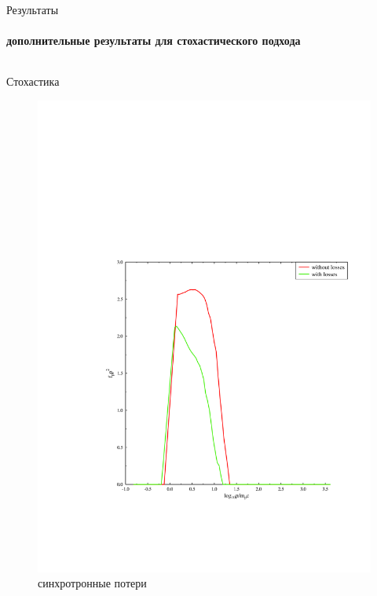 \documentclass[8pt,pdf,hyperref={unicode},serif]{beamer}
\begin{document}
\begin{frame}{Результаты}
\framesubtitle{дополнительные результаты для стохастического подхода}
\begin{columns}
\begin{column}{0.5\textwidth}
Стохастика
\begin{figure}[H]
\centering
\includegraphics[width=0.90\linewidth]{stoh_sinh_or_not}
\caption{синхротронные потери}
\end{figure}
\end{column}


\end{columns}
\end{frame}
\end{document}
